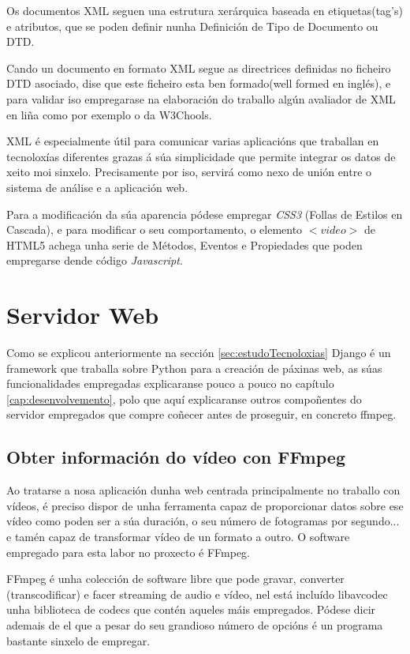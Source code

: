     Os documentos XML seguen una estrutura xerárquica baseada en etiquetas(tag's) e atributos,
    que se poden definir nunha Definición de Tipo de Documento ou DTD. \cite{dtd-web-page}
    
    Cando un documento en formato XML segue as directrices definidas no ficheiro DTD asociado,
    dise que este ficheiro esta ben formado(well formed en inglés), e para validar iso empregarase
    na elaboración do traballo algún avaliador de XML en liña como por exemplo o da W3Chools.\cite{xml-validator}
    
    XML é especialmente útil para comunicar varias aplicacións que traballan en tecnoloxías 
    diferentes grazas á súa simplicidade que permite integrar os datos de xeito moi sinxelo. Precisamente
    por iso, servirá como nexo de unión entre o sistema de análise e a aplicación web. 
    
    Para a modificación da súa aparencia pódese empregar \emph{CSS3} (Follas de Estilos en 
    Cascada), e para modificar o seu comportamento, o elemento $<video>$ de HTML5 achega
    unha serie de Métodos, Eventos e Propiedades\cite{w3school-video-events} que poden
    empregarse dende código \emph{Javascript}.
    
\section{Servidor Web}
    Como se explicou anteriormente na sección \ref{sec:estudoTecnoloxias} Django é un framework
    que traballa sobre Python para a creación de páxinas web, as súas funcionalidades empregadas
    explicaranse pouco a pouco no capítulo \ref{cap:desenvolvemento}, polo que aquí explicaranse
    outros compoñentes do servidor empregados que compre coñecer antes de proseguir, en concreto 
    ffmpeg.
    
\subsection{Obter información do vídeo con FFmpeg}
    Ao tratarse a nosa aplicación dunha web centrada principalmente no traballo con vídeos, é 
    preciso dispor de unha ferramenta capaz de proporcionar datos sobre ese vídeo como poden ser 
    a súa duración, o seu número de fotogramas por segundo... e tamén capaz de transformar vídeo
    de un formato a outro. O software empregado para esta labor no proxecto é FFmpeg.

    FFmpeg é unha colección de software libre que pode gravar, converter (transcodificar) e facer
    streaming de audio e vídeo, nel está incluído libavcodec unha biblioteca de codecs que contén 
    aqueles máis empregados. Pódese dicir ademais de el que a pesar do seu grandioso número de 
    opcións é un programa bastante sinxelo de empregar.
    